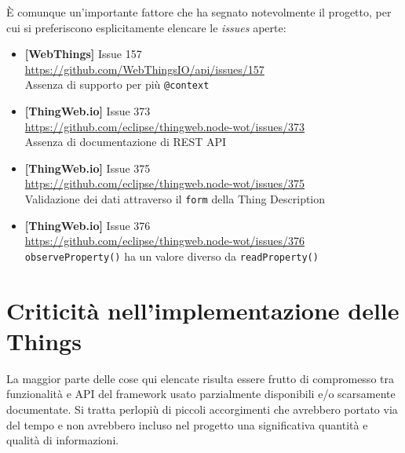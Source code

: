 \documentclass[12pt,a4paper,openright,oneside]{report}
\begin{document}
È comunque un'importante fattore che ha segnato notevolmente il progetto, per cui si preferiscono esplicitamente elencare le \textit{issues} aperte:

\begin{itemize}
	\item \textbf{[WebThings]} Issue 157\\
	\url{https://github.com/WebThingsIO/api/issues/157}\\
	Assenza di supporto per più \texttt{@context}
	
	\item \textbf{[ThingWeb.io]} Issue 373\\
	\url{https://github.com/eclipse/thingweb.node-wot/issues/373}\\
	Assenza di documentazione di REST API
	
	\item \textbf{[ThingWeb.io]} Issue 375\\
	\url{https://github.com/eclipse/thingweb.node-wot/issues/375}\\
	Validazione dei dati attraverso il \texttt{form} della Thing Description
	
	\item \textbf{[ThingWeb.io]} Issue 376\\
	\url{https://github.com/eclipse/thingweb.node-wot/issues/376}\\
	\texttt{observeProperty()} ha un valore diverso da \texttt{readProperty()}\\
\end{itemize}




\section{Criticità nell'implementazione delle Things}
La maggior parte delle cose qui elencate risulta essere frutto di compromesso tra funzionalità e API del framework usato parzialmente disponibili e/o scarsamente documentate. Si tratta perlopiù di piccoli accorgimenti che avrebbero portato via del tempo e non avrebbero incluso nel progetto una significativa quantità e qualità di informazioni.
\end{document}
